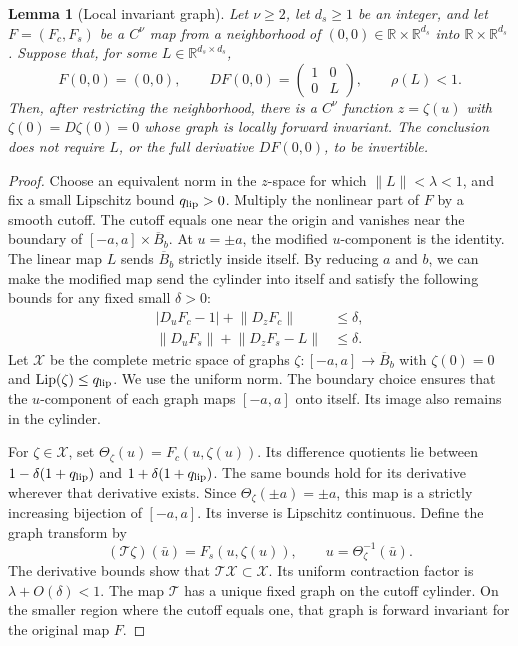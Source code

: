 \documentclass[11pt]{article}
\newtheorem{lemma}[theorem]{Lemma}
\newcommand{\R}{\mathbb R}
\newcommand{\norm}[1]{\lVert #1\rVert}
\begin{document}
\begin{lemma}[Local invariant graph]\label{lem:graph-transform}
Let $\nu\ge2$, let $d_s\ge1$ be an integer, and let $F=(F_c,F_s)$ be a
$C^\nu$ map from a neighborhood of $(0,0)\in\R\times\R^{d_s}$ into
$\R\times\R^{d_s}$.  Suppose that, for some
$L\in\R^{d_s\times d_s}$,
\[
F(0,0)=(0,0),\qquad
DF(0,0)=\begin{pmatrix}1&0\\0&L\end{pmatrix},
\qquad \rho(L)<1.
\]
Then, after restricting the neighborhood, there is a $C^\nu$ function
$z=\zeta(u)$ with $\zeta(0)=D\zeta(0)=0$ whose graph is locally forward
invariant.  The conclusion does not require $L$, or the full derivative
$DF(0,0)$, to be invertible.
\end{lemma}

\begin{proof}
Choose an equivalent norm in the $z$-space for which
$\norm{L}<\lambda<1$, and fix a small Lipschitz bound $q_{\rm lip}>0$.
Multiply the nonlinear part of $F$ by a smooth cutoff.  The cutoff equals one
near the origin and vanishes near the boundary of
$[-a,a]\times\overline B_b$.  At $u=\pm a$, the modified $u$-component is the
identity.  The linear map $L$ sends $\overline B_b$ strictly inside itself.  By
reducing $a$ and $b$, we can make the modified map send the cylinder into
itself and satisfy the following bounds for any fixed small $\delta>0$:
\begin{align*}
|D_uF_c-1|+\norm{D_zF_c}&\le\delta,\\
\norm{D_uF_s}+\norm{D_zF_s-L}&\le\delta.
\end{align*}
Let $\mathcal X$ be the complete metric space of graphs
$\zeta:[-a,a]\to\overline B_b$ with $\zeta(0)=0$ and
$\operatorname{Lip}(\zeta)\le q_{\rm lip}$.  We use the uniform norm.  The
boundary choice ensures that the $u$-component of each graph maps $[-a,a]$
onto itself.  Its image also remains in the cylinder.

For $\zeta\in\mathcal X$, set
$\Theta_\zeta(u)=F_c(u,\zeta(u))$.  Its difference quotients lie between
$1-\delta(1+q_{\rm lip})$ and $1+\delta(1+q_{\rm lip})$.  The same bounds hold
for its derivative wherever that derivative exists.  Since
$\Theta_\zeta(\pm a)=\pm a$, this map is a strictly increasing bijection of
$[-a,a]$.  Its inverse is Lipschitz continuous.
Define the graph transform by
\[
(\mathcal T\zeta)(\bar u)
=F_s(u,\zeta(u)),
\qquad u=\Theta_\zeta^{-1}(\bar u).
\]
The derivative bounds show that $\mathcal T\mathcal X\subset\mathcal X$.  Its
uniform contraction factor is $\lambda+O(\delta)<1$.  The map $\mathcal T$
has a unique fixed graph on the cutoff cylinder.  On the smaller
region where the cutoff equals one, that graph is forward invariant for the
original map $F$.


\end{proof}
\end{document}
